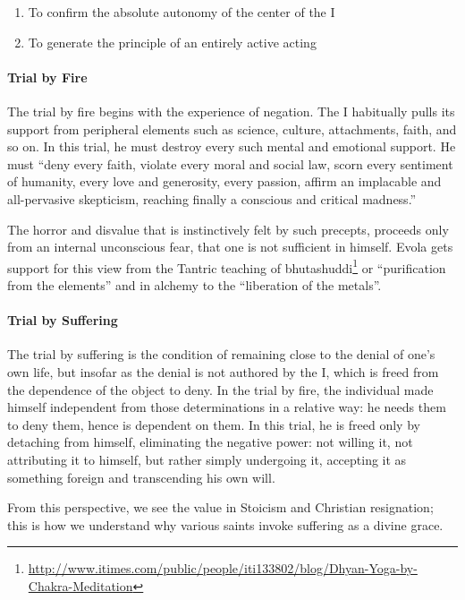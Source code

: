 \begin{enumerate}


\item To confirm the absolute autonomy of the center of the I

\item To generate the principle of an entirely active acting
\end{enumerate}

\paragraph{Trial by Fire}


The trial by fire begins with the experience of negation. The I habitually pulls its support from peripheral elements such as science, culture, attachments, faith, and so on. In this trial, he must destroy every such mental and emotional support. He must ``deny every faith, violate every moral and social law, scorn every sentiment of humanity, every love and generosity, every passion, affirm an implacable and all-pervasive skepticism, reaching finally a conscious and critical madness.''

The horror and disvalue that is instinctively felt by such precepts, proceeds only from an internal unconscious fear, that one is not sufficient in himself. Evola gets support for this view from the Tantric teaching of bhutashuddi\footnote{\url{http://www.itimes.com/public/people/iti133802/blog/Dhyan-Yoga-by-Chakra-Meditation}} or ``purification from the elements'' and in alchemy to the ``liberation of the metals''.

\paragraph{Trial by Suffering}


The trial by suffering is the condition of remaining close to the denial of one's own life, but insofar as the denial is not authored by the I, which is freed from the dependence of the object to deny. In the trial by fire, the individual made himself independent from those determinations in a relative way: he needs them to deny them, hence is dependent on them. In this trial, he is freed only by detaching from himself, eliminating the negative power: not willing it, not attributing it to himself, but rather simply undergoing it, accepting it as something foreign and transcending his own will.

From this perspective, we see the value in Stoicism and Christian resignation; this is how we understand why various saints invoke suffering as a divine grace.

